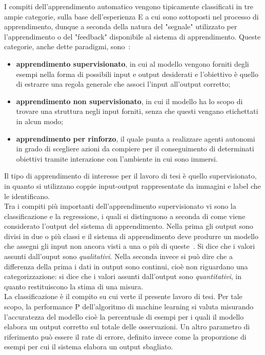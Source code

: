 I compiti dell'apprendimento automatico vengono tipicamente classificati in tre ampie categorie, 
sulla base dell’esperienza E a cui sono sottoposti nel processo di apprendimento, dunque a seconda 
della natura del "segnale" utilizzato per l'apprendimento o del "feedback" disponibile al sistema di
 apprendimento. Queste categorie, anche dette paradigmi, sono~\cite{ml}:
 \begin{itemize}
\item \textbf{apprendimento supervisionato}, in cui al modello vengono forniti degli esempi nella forma
 di possibili input e output desiderati e l'obiettivo è quello di estrarre una regola
  generale che associ l'input all'output corretto;
\item \textbf{apprendimento non supervisionato}, in cui il modello ha lo scopo di trovare una
 struttura negli 
input forniti, senza che questi vengano etichettati in alcun modo;
\item \textbf{apprendimento per rinforzo}, il quale punta a realizzare agenti 
autonomi in grado di scegliere
 azioni da compiere per il conseguimento di determinati obiettivi tramite interazione con l'ambiente
  in cui sono immersi. 
\end{itemize}
Il tipo di apprendimento di interesse per il lavoro di tesi è quello supervisionato, in quanto si utilizzano coppie input-output 
rappresentate da immagini e label che le identificano. \\
Tra i compiti più importanti dell’apprendimento supervisionato vi sono la classificazione
 e la regressione, i quali si distinguono a seconda di come viene considerato l’output 
 del sistema di apprendimento. 
 Nella prima gli output sono divisi in due o più classi e il sistema di apprendimento 
 deve produrre un modello che assegni gli input non ancora visti a una o più di queste~\cite{class}. 
 Si dice che i valori assunti dall'ouput sono \emph{qualitativi}. 
 Nella seconda invece si può dire che a differenza della prima i dati in output sono continui, 
 cioè non riguardano una categorizzazione: si dice che i valori assunti dall'output sono \emph{quantitativi},
  in quanto restituiscono la stima di una misura. \\
La classificazione è il compito su cui verte il presente lavoro di tesi.
 Per tale scopo, la performance P dell’algoritmo di machine learning si valuta misurando
  l’accuratezza del modello cioè la percentuale di esempi per i quali il modello elabora
   un output 
  corretto sul totale delle osservazioni. Un altro parametro di riferimento può essere il
   rate di errore,
   definito invece come la
    proporzione di esempi per cui il sistema elabora un output sbagliato.


